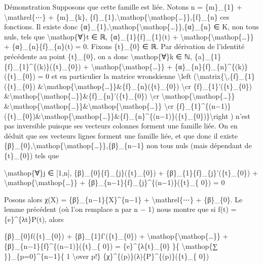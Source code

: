 \documentclass[]{article}
\begin{document}
Démonstration Supposons que cette famille est liée. Notons n =
\{m\}\_\{1\} + \textbackslash{}mathrel\{⋯\} + \{m\}\_\{k\},
\{f\}\_\{1\},\textbackslash{}mathop\{\textbackslash{}mathop\{\ldots{}\}\},\{f\}\_\{n\}
ces fonctions. Il existe donc
\{α\}\_\{1\},\textbackslash{}mathop\{\textbackslash{}mathop\{\ldots{}\}\},\{α\}\_\{n\}
∈ K, non tous nuls, tels que \textbackslash{}mathop\{∀\}t ∈ ℝ,
\{α\}\_\{1\}\{f\}\_\{1\}(t) +
\textbackslash{}mathop\{\textbackslash{}mathop\{\ldots{}\}\} +
\{α\}\_\{n\}\{f\}\_\{n\}(t) = 0. Fixons \{t\}\_\{0\} ∈ ℝ. Par dérivation
de l'identité précédente au point \{t\}\_\{0\}, on a donc
\textbackslash{}mathop\{∀\}k ∈ ℕ,
\{a\}\_\{1\}\{f\}\_\{1\}\^{}\{(k)\}(\{t\}\_\{0\}) +
\textbackslash{}mathop\{\textbackslash{}mathop\{\ldots{}\}\} +
\{α\}\_\{n\}\{f\}\_\{n\}\^{}\{(k)\}(\{t\}\_\{0\}) = 0 et en particulier
la matrice wronskienne \textbackslash{}left
(\textbackslash{}matrix\{\textbackslash{},\{f\}\_\{1\}(\{t\}\_\{0\})
\&\textbackslash{}mathop\{\textbackslash{}mathop\{\ldots{}\}\}\&\{f\}\_\{n\}(\{t\}\_\{0\})
\textbackslash{}cr \{f\}\_\{1\}'(\{t\}\_\{0\})
\&\textbackslash{}mathop\{\textbackslash{}mathop\{\ldots{}\}\}\&\{f\}\_\{n\}'(\{t\}\_\{0\})
\textbackslash{}cr
\textbackslash{}mathop\{\textbackslash{}mathop\{\ldots{}\}\}
\&\textbackslash{}mathop\{\textbackslash{}mathop\{\ldots{}\}\}\&\textbackslash{}mathop\{\textbackslash{}mathop\{\ldots{}\}\}
\textbackslash{}cr
\{f\}\_\{1\}\^{}\{(n−1)\}(\{t\}\_\{0\})\&\textbackslash{}mathop\{\textbackslash{}mathop\{\ldots{}\}\}\&\{f\}\_\{n\}\^{}\{(n−1)\}(\{t\}\_\{0\})\}\textbackslash{}right
) n'est pas inversible puisque ses vecteurs colonnes forment une famille
liée. On en déduit que ses vecteurs lignes forment une famille liée, et
que donc il existe
\{β\}\_\{0\},\textbackslash{}mathop\{\textbackslash{}mathop\{\ldots{}\}\},\{β\}\_\{n−1\}
non tous nuls (mais dépendant de \{t\}\_\{0\}) tels que

\textbackslash{}mathop\{∀\}j ∈ {[}1,n{]},
\{β\}\_\{0\}\{f\}\_\{j\}(\{t\}\_\{0\}) +
\{β\}\_\{1\}\{f\}\_\{j\}'(\{t\}\_\{0\}) +
\textbackslash{}mathop\{\textbackslash{}mathop\{\ldots{}\}\} +
\{β\}\_\{n−1\}\{f\}\_\{j\}\^{}\{(n−1)\}(\{t\}\_\{ 0\}) = 0

Posons alors χ(X) = \{β\}\_\{n−1\}\{X\}\^{}\{n−1\} +
\textbackslash{}mathrel\{⋯\} + \{β\}\_\{0\}. Le lemme précédent (où l'on
remplace n par n − 1) nous montre que si f(t) = \{e\}\^{}\{λt\}P(t),
alors

\{β\}\_\{0\}f(\{t\}\_\{0\}) + \{β\}\_\{1\}f'(\{t\}\_\{0\}) +
\textbackslash{}mathop\{\textbackslash{}mathop\{\ldots{}\}\} +
\{β\}\_\{n−1\}\{f\}\^{}\{(n−1)\}(\{t\}\_\{ 0\}) =
\{e\}\^{}\{λ\{t\}\_\{0\} \}\{ \textbackslash{}mathop\{∑
\}\}\_\{p=0\}\^{}\{n−1\}\{ 1 \textbackslash{}over p!\}
\{χ\}\^{}\{(p)\}(λ)\{P\}\^{}\{(p)\}(\{t\}\_\{ 0\})
\end{document}
